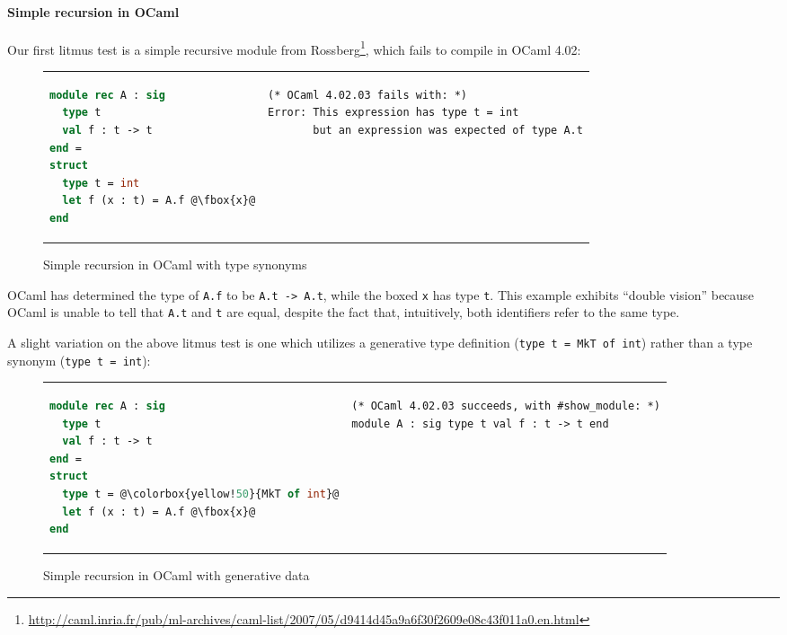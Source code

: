 \paragraph{Simple recursion in OCaml}  Our first litmus test is a simple
recursive module from Rossberg\footnote{\url{http://caml.inria.fr/pub/ml-archives/caml-list/2007/05/d9414d45a9a6f30f2609e08c43f011a0.en.html}}, which fails to compile in OCaml 4.02:

\begin{figure}[H]
\begin{tabular}{p{} p{}}
\begin{lstlisting}[language=ML,escapechar=@]
module rec A : sig
  type t
  val f : t -> t
end =
struct
  type t = int
  let f (x : t) = A.f @\fbox{x}@
end
\end{lstlisting}
&
\begin{verbatim}
(* OCaml 4.02.03 fails with: *)
Error: This expression has type t = int
       but an expression was expected of type A.t
\end{verbatim}
\end{tabular}
\caption{Simple recursion in OCaml with type synonyms}
\label{fig:double-vision-simple-recursion-ocaml-synonym}
\end{figure}

\noindent
OCaml has determined the type of \verb|A.f| to be \verb|A.t -> A.t|,
while the boxed \verb|x| has type \verb|t|.  This example exhibits
``double vision'' because OCaml is unable to tell that \verb|A.t| and
\verb|t| are equal, despite the fact that, intuitively, both identifiers refer to
the same type.

A slight variation on the above litmus test is one which utilizes a generative type
definition (\verb|type t = MkT of int|) rather than a type synonym (\verb|type t = int|):

\begin{figure}[H]
\begin{tabular}{p{} p{}}
\begin{lstlisting}[language=ML,escapechar=@]
module rec A : sig
  type t
  val f : t -> t
end =
struct
  type t = @\colorbox{yellow!50}{MkT of int}@
  let f (x : t) = A.f @\fbox{x}@
end
\end{lstlisting}
&
\begin{verbatim}
(* OCaml 4.02.03 succeeds, with #show_module: *)
module A : sig type t val f : t -> t end
\end{verbatim}
\end{tabular}
\caption{Simple recursion in OCaml with generative data}
\label{fig:double-vision-simple-recursion-ocaml-generative}
\end{figure}

